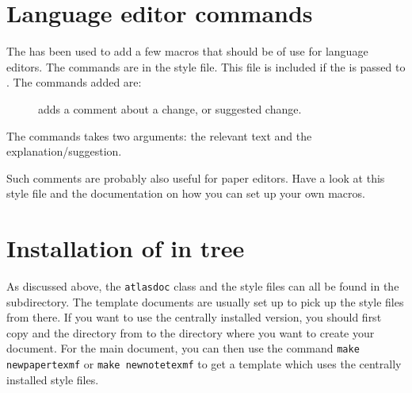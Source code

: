 \section{Language editor commands}
\label{sec:langedit}

The  has been used to add a few macros that should be of use
for language editors. The commands are in the  style file.
This file is included if the  is passed to .
The commands added are:
\begin{description}
  \item[] adds a comment about a change, or suggested change.
\end{description}
The commands takes two arguments: the relevant text and the explanation/suggestion.

Such comments are probably also useful for paper editors.
Have a look at this style file and the  documentation on how
you can set up your own macros.


\section{Installation of  in  tree}
\label{sec:texmf}

As discussed above, the \texttt{atlasdoc} class and the style files can all be found in the 
 subdirectory. The template documents are usually set up to pick up the style files from there.
If you want to use the centrally installed version,
you should first copy  and the  directory from 
 to the directory where you want to create your document.
For the main document, you can then use the command 
\texttt{make newpapertexmf} or \texttt{make newnotetexmf} to get a template which uses the
centrally installed style files.

